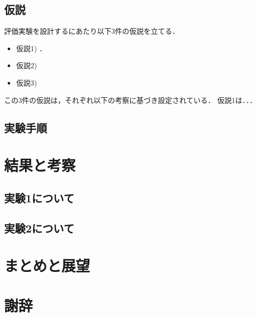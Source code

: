 \documentclass[12pt,a4j]{jreport}
\begin{document}
\section{仮説}
評価実験を設計するにあたり以下3件の仮説を立てる．
\begin{itemize}
  \item 仮説1) ．
  \item 仮説2) 
  \item 仮説3) 
\end{itemize}
この3件の仮説は，それぞれ以下の考察に基づき設定されている．
仮説1は．．．


\section{実験手順}




\chapter{結果と考察}


\section{実験1について}


\section{実験2について}





\chapter{まとめと展望}





\chapter*{謝辞}



\end{document}
